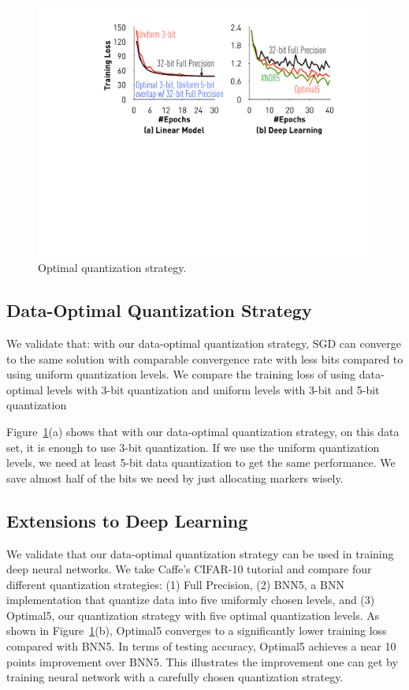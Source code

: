 \documentclass{article}
\begin{document}
\begin{figure}[t]
\centering
\includegraphics[width=\columnwidth]{final-experiments/optimal} 
\caption{Optimal quantization strategy.}
\label{fig:optimal}
\end{figure}

\subsection{Data-Optimal Quantization Strategy}
We validate that: with our data-optimal quantization strategy, 
SGD can converge to the same solution with comparable convergence rate with less bits 
compared to using uniform quantization levels. We compare the training loss of using data-optimal levels with 3-bit quantization and uniform levels with 3-bit and 5-bit quantization


Figure~\ref{fig:optimal}(a) shows that with our data-optimal quantization strategy, on this data set, it is enough to use 3-bit quantization. If we use the uniform quantization levels, we need at least 5-bit data quantization to get the same performance. We save almost half of the bits we need by just allocating markers wisely.


\subsection{Extensions to Deep Learning}

We validate that our data-optimal quantization
strategy can be used in training deep neural
networks. We take Caffe's CIFAR-10 tutorial
and compare four different quantization
strategies: (1) Full Precision, (2) BNN5, 
a BNN implementation that quantize data into
five uniformly chosen levels, and (3)
Optimal5, our quantization strategy with
five optimal quantization levels. As
shown in Figure~\ref{fig:optimal}(b), Optimal5
converges to a significantly lower training 
loss compared with BNN5. In terms of
testing accuracy, Optimal5 achieves a
near 10 points improvement over BNN5.
This illustrates the improvement
one can get by training neural network with
a carefully chosen quantization strategy.
\end{document}
